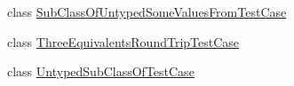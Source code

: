 \begin{DoxyCompactItemize}
\item 
class \hyperlink{classorg_1_1semanticweb_1_1owlapi_1_1api_1_1test_1_1axioms_1_1_sub_class_of_untyped_some_values_from_test_case}{Sub\-Class\-Of\-Untyped\-Some\-Values\-From\-Test\-Case}
\item 
class \hyperlink{classorg_1_1semanticweb_1_1owlapi_1_1api_1_1test_1_1axioms_1_1_three_equivalents_round_trip_test_case}{Three\-Equivalents\-Round\-Trip\-Test\-Case}
\item 
class \hyperlink{classorg_1_1semanticweb_1_1owlapi_1_1api_1_1test_1_1axioms_1_1_untyped_sub_class_of_test_case}{Untyped\-Sub\-Class\-Of\-Test\-Case}
\end{DoxyCompactItemize}
